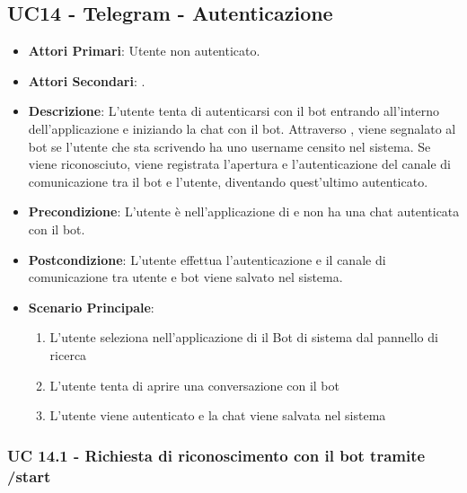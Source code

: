 \subsection{UC14 - Telegram - Autenticazione}
		
		
	\begin{itemize}
		\item \textbf{Attori Primari}: Utente non autenticato.
		\item \textbf{Attori Secondari}: .
		\item \textbf{Descrizione}: L'utente tenta di autenticarsi con il bot  entrando all'interno dell'applicazione e iniziando la chat con il bot. Attraverso , viene segnalato al bot se l'utente che sta scrivendo ha uno username censito nel sistema. Se viene riconosciuto, viene registrata l'apertura e l'autenticazione del canale di comunicazione tra il bot e l'utente, diventando quest'ultimo autenticato. 
		\item \textbf{Precondizione}: L'utente è nell'applicazione di  e non ha una chat autenticata con il bot.
		\item \textbf{Postcondizione}: L'utente effettua l'autenticazione e il canale di comunicazione tra utente e bot viene salvato nel sistema.
		\item \textbf{Scenario Principale}:
		\begin{enumerate}
			\item L'utente seleziona nell'applicazione di  il Bot di sistema dal pannello di ricerca
			\item L'utente tenta di aprire una conversazione con il bot
			\item L'utente viene autenticato e la chat viene salvata nel sistema
		\end{enumerate}
	\end{itemize}
	
	\subsubsection{UC 14.1 - Richiesta di riconoscimento con il bot tramite /start}

